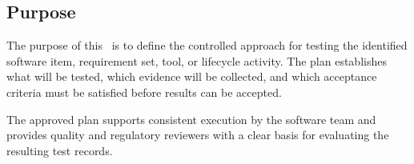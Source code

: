 \subsection{Purpose}
The purpose of this \stdTestPlan\ is to define the controlled approach for
testing the identified software item, requirement set, tool, or lifecycle
activity.  The plan establishes what will be tested, which evidence will be
collected, and which acceptance criteria must be satisfied before results can be
accepted.

\tlcVspace

The approved plan supports consistent execution by the software team and
provides quality and regulatory reviewers with a clear basis for evaluating the
resulting test records.
